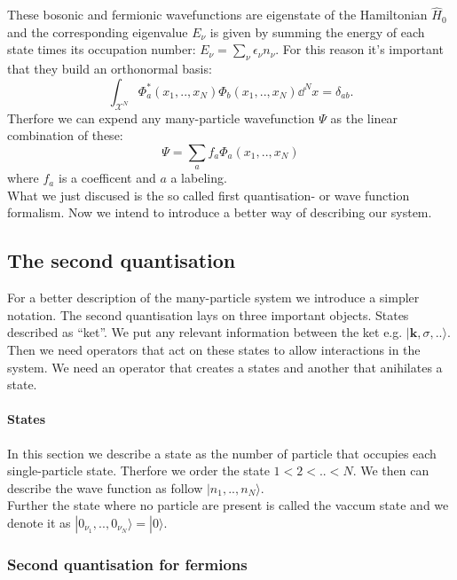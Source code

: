 \documentclass[../main.tex]{subfile}
\begin{document}
These bosonic and fermionic wavefunctions are eigenstate of the Hamiltonian $\hat{H}_0$ and the corresponding eigenvalue $E_{\nu}$
is given by summing the energy of each state times its occupation number: $E_{\nu} = \sum_{\nu} \epsilon_{\nu} n_{\nu}$.
For this reason it's important that they build an orthonormal basis:
\[
    \int_{\mathcal{X}^N} \Phi_a^{\ast}(x_1,..,x_N) \Phi_b(x_1,..,x_N) \dd^N x = \delta_{ab}.
\]
Therfore we can expend any many-particle wavefunction $\Psi$ as the linear combination of these:
\[
    \Psi = \sum_a f_a \Phi_a(x_1,..,x_N)
\]
where $f_a$ is a coefficent and $a$ a labeling.\\

What we just discused is the so called first quantisation- or wave function formalism. Now we intend to introduce a better way of 
describing our system.

\subsection{The second quantisation}
For a better description of the many-particle system we introduce a simpler notation. The second quantisation lays on three important objects. States described as ``ket''. We put any relevant information between the ket
e.g. $|\bm{k}, \sigma,..\rangle$. Then we need operators that act on these states to allow interactions in the system. 
We need an operator that creates a states and another that anihilates a state.\\

\paragraph{States} In this section we describe a state as the number of particle that occupies each single-particle state. Therfore
we order the state $1<2<..<N$. We then can describe the wave function as follow $|n_{1},..,n_{N}\rangle$.\\

Further the state where no particle are present is called the vaccum state and we denote it as $|0_{\nu_1},..,0_{\nu_N}\rangle = |0\rangle$.

\subsubsection{Second quantisation for fermions}
\end{document}
